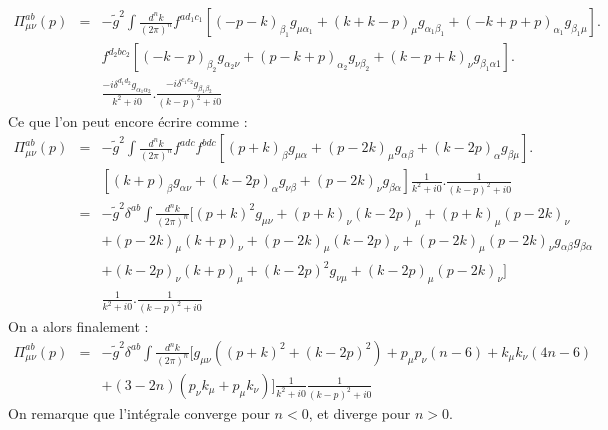 \documentclass[a4paper,11pt]{article} %
\theoremstyle{plain}
\theoremstyle{definition}
\theoremstyle{remark}
\numberwithin{equation}{section}
\numberwithin{equation}{subsection}
\numberwithin{figure}{section}
\begin{document}
\begin{eqnarray*}
 \Pi^{ab}_{\mu\nu}(p) &=& -\tilde{g}^{2}  \int \frac{d^{n}k}{\left(2\pi\right)^n} f^{ad_{1}c_{1}} 
\left[(-p-k)_{\beta_{1}}g_{\mu\alpha_{1}}  +  (k+k-p)_{\mu}g_{\alpha_{1}\beta_{1}}  +  (-k+p+p)_{\alpha_{1}}g_{\beta_{1}\mu}  \right]. \nonumber \\
&& f^{d_{2}bc_{2}} \left[(-k-p)_{\beta_{2}}g_{\alpha_{2}\nu}  +  (p-k+p)_{\alpha_{2}}g_{\nu\beta_{2}}  
+  (k-p+k)_{\nu}g_{\beta_{1}\alpha{1}}  \right].\nonumber  \\
&& \frac{-i\delta^{d_{1}d_{2}}g_{\alpha_{1}\alpha_{2}}}{k^2+i0} . \frac{-i\delta^{c_{1}c_{2}}g_{\beta_{1}\beta_{2}}}{(k-p)^2+i0} 
\end{eqnarray*}
Ce que l'on peut encore écrire comme :
\begin{eqnarray*}
 \Pi^{ab}_{\mu\nu}(p)      &=&  -\tilde{g}^{2} \int \frac{d^{n}k}{\left(2\pi\right)^n} f^{adc} f^{bdc}
\left[  (p+k)_{\beta}g_{\mu\alpha}  +  (p-2k)_{\mu}g_{\alpha\beta}  +  (k-2p)_{\alpha}g_{\beta\mu}  \right].   \nonumber  \\
&& \left[  (k+p)_{\beta} g_{\alpha\nu}  +  (k-2p)_{\alpha}g_{\nu\beta}  +  (p-2k)_{\nu}g_{\beta\alpha}  \right]  
\frac{1}{k^2+i0} . \frac{1}{(k-p)^2+i0}\\
                      &=&  -\tilde{g}^{2}  \delta^{ab} \int \frac{d^{n}k}{\left(2\pi\right)^n} 
[  (p+k)^{2}g_{\mu\nu}  +  (p+k)_{\nu}(k-2p)_{\mu}  +  (p+k)_{\mu}(p-2k)_{\nu}  \nonumber  \\
&&  +  (p-2k)_{\mu}(k+p)_{\nu}  +  (p-2k)_{\mu}(k-2p)_{\nu}  +  (p-2k)_{\mu}(p-2k)_{\nu}g_{\alpha\beta}g_{\beta\alpha}  \nonumber  \\
&&  +  (k-2p)_{\nu}(k+p)_{\mu}  +  (k-2p)^2g_{\nu\mu}  +  (k-2p)_{\mu}(p-2k)_{\nu}  ] \nonumber  \\
&&  \frac{1}{k^2+i0} . \frac{1}{(k-p)^2+i0}
\end{eqnarray*}
On a alors finalement :
\begin{eqnarray*}
 \Pi^{ab}_{\mu\nu}(p) &=&  -\tilde{g}^{2}  \delta^{ab} \int \frac{d^{n}k}{\left(2\pi\right)^n} 
[g_{\mu\nu}\left((p+k)^{2} +(k-2p)^2\right) + p_{\mu}p_{\nu}\left(n-6\right)+k_{\mu}k_{\nu}\left(4n-6\right)  \nonumber  \\
&&  +(3-2n)(p_{\nu}k_{\mu}+p_{\mu}k_{\nu})]\frac{1}{k^2+i0}\frac{1}{(k-p)^2+i0}
\end{eqnarray*}
On remarque que l'intégrale converge pour $n<0$, et diverge pour $n>0$.\\
\end{document}
